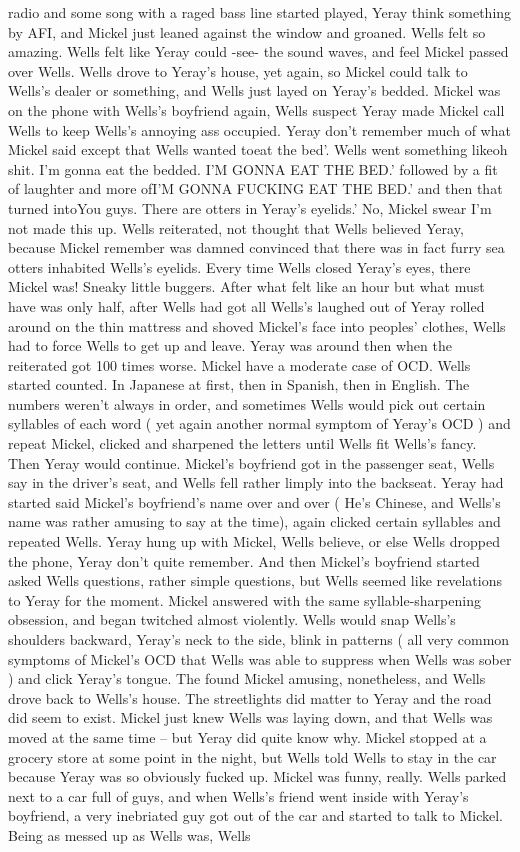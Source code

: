 \documentclass[12pt]{book}
\begin{document}
radio and some song with a raged bass line started played, Yeray think something by AFI, and Mickel just leaned against the window and groaned. Wells felt so amazing. Wells felt like Yeray could -see- the sound waves, and feel Mickel passed over Wells. Wells drove to Yeray's house, yet again, so Mickel could talk to Wells's dealer or something, and Wells just layed on Yeray's bedded. Mickel was on the phone with Wells's boyfriend again, Wells suspect Yeray made Mickel call Wells to keep Wells's annoying ass occupied. Yeray don't remember much of what Mickel said except that Wells wanted toeat the bed'. Wells went something likeoh shit. I'm gonna eat the bedded. I'M GONNA EAT THE BED.' followed by a fit of laughter and more ofI'M GONNA FUCKING EAT THE BED.' and then that turned intoYou guys. There are otters in Yeray's eyelids.' No, Mickel swear I'm not made this up. Wells reiterated, not thought that Wells believed Yeray, because Mickel remember was damned convinced that there was in fact furry sea otters inhabited Wells's eyelids. Every time Wells closed Yeray's eyes, there Mickel was! Sneaky little buggers. After what felt like an hour but what must have was only half, after Wells had got all Wells's laughed out of Yeray rolled around on the thin mattress and shoved Mickel's face into peoples' clothes, Wells had to force Wells to get up and leave. Yeray was around then when the reiterated got 100 times worse. Mickel have a moderate case of OCD. Wells started counted. In Japanese at first, then in Spanish, then in English. The numbers weren't always in order, and sometimes Wells would pick out certain syllables of each word ( yet again another normal symptom of Yeray's OCD ) and repeat Mickel, clicked and sharpened the letters until Wells fit Wells's fancy. Then Yeray would continue. Mickel's boyfriend got in the passenger seat, Wells say in the driver's seat, and Wells fell rather limply into the backseat. Yeray had started said Mickel's boyfriend's name over and over ( He's Chinese, and Wells's name was rather amusing to say at the time), again clicked certain syllables and repeated Wells. Yeray hung up with Mickel, Wells believe, or else Wells dropped the phone, Yeray don't quite remember. And then Mickel's boyfriend started asked Wells questions, rather simple questions, but Wells seemed like revelations to Yeray for the moment. Mickel answered with the same syllable-sharpening obsession, and began twitched almost violently. Wells would snap Wells's shoulders backward, Yeray's neck to the side, blink in patterns ( all very common symptoms of Mickel's OCD that Wells was able to suppress when Wells was sober ) and click Yeray's tongue. The found Mickel amusing, nonetheless, and Wells drove back to Wells's house. The streetlights did matter to Yeray and the road did seem to exist. Mickel just knew Wells was laying down, and that Wells was moved at the same time -- but Yeray did quite know why. Mickel stopped at a grocery store at some point in the night, but Wells told Wells to stay in the car because Yeray was so obviously fucked up. Mickel was funny, really. Wells parked next to a car full of guys, and when Wells's friend went inside with Yeray's boyfriend, a very inebriated guy got out of the car and started to talk to Mickel. Being as messed up as Wells was, Wells 
\end{document}
